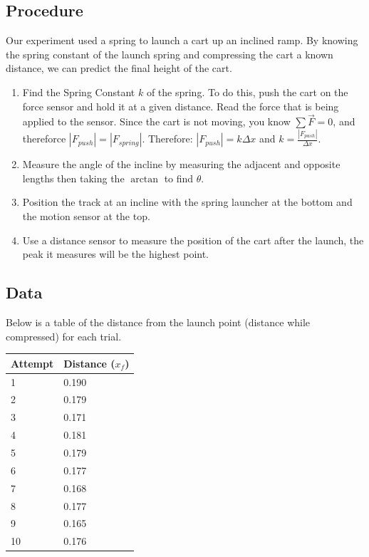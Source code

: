 \documentclass[11pt, letterpaper, includehead]{article}
\begin{document}
\subsection{Procedure}
Our experiment used a spring to launch a cart up an inclined ramp. By knowing the spring
constant of the launch spring and compressing the cart a known distance, we can predict the
final height of the cart.
\begin{enumerate} 
  \item Find the Spring Constant $k$ of the spring. To do this, push the cart on the force
  sensor and hold it at a given distance. Read the force that is being applied to the sensor.
  Since the cart is not moving, you know $\sum \vec{F} = 0$, and thereforce $|F_{push}| = |F_{spring}|$.
  Therefore: $|F_{push}| = k\Delta x$ and $k = \frac{|{F}_{push}|}{\Delta x}$.
  \item Measure the angle of the incline by measuring the adjacent and opposite lengths
  then taking the $\arctan$ to find $\theta$.
  \item Position the track at an incline with the spring launcher at the bottom 
        and the motion sensor at the top. 
  \item Use a distance sensor to measure the position of the cart after the launch, the peak it measures
        will be the highest point.
\end{enumerate}

\subsection{Data}
Below is a table of the distance from the launch point (distance while compressed)
for each trial.
\begin{center} 
  \begin{tabular}{|  m{2cm} | m{3cm} |} 
    \hline
    \textbf{Attempt} & \textbf{Distance ($x_f$)} \\ 
    \hline
    1 & 0.190\\ 
    \hline
    2 & 0.179\\ 
    \hline
    3 & 0.171\\ 
    \hline
    4 & 0.181\\ 
    \hline
    5 & 0.179\\ 
    \hline
    6 & 0.177\\ 
    \hline
    7 & 0.168\\ 
    \hline
    8 & 0.177\\ 
    \hline
    9 & 0.165\\ 
    \hline
    10 & 0.176\\ 
    \hline
  \end{tabular} 
\end{center}
\end{document}
